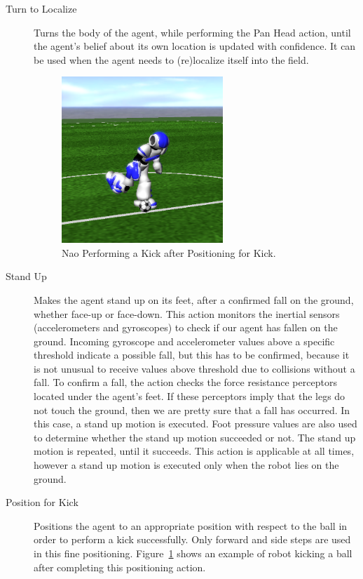 \begin{description}
 \item[Turn to Localize] Turns the body of the agent, while performing the Pan Head action, until the agent's belief about its own location is updated with confidence. It can be used when the agent needs to (re)localize itself into the field.

\begin{figure}[t!]
  \centering
  \includegraphics[trim=0cm 3cm 0cm 4cm, clip,width=0.6\textwidth]{Chapter3/figures/NaoKick.png}
  \caption{Nao Performing a Kick after Positioning for Kick.}
  \label{fig:NaoKick}
\end{figure}

 \item[Stand Up] Makes the agent stand up on its feet, after a confirmed fall on the ground, whether face-up or face-down. This action monitors the inertial sensors (accelerometers and gyroscopes) to check if our agent has fallen on the ground. Incoming gyroscope and accelerometer values above a specific threshold indicate a possible fall, but this has to be confirmed, because it is not unusual to receive values above threshold due to collisions without a fall. To confirm a fall, the action checks the force resistance perceptors located under the agent's feet. If these perceptors imply that the legs do not touch the ground, then we are pretty sure that a fall has occurred. In this case, a stand up motion is executed. Foot pressure values are also used to determine whether the stand up motion succeeded or not. The stand up motion is repeated, until it succeeds. This action is applicable at all times, however a stand up motion is executed only when the robot lies on the ground. 

  
 \item[Position for Kick] Positions the agent to an appropriate position with respect to the ball in order to perform a kick successfully. Only forward and side steps are used in this fine positioning. Figure~\ref{fig:NaoKick} shows an example of robot kicking a ball after completing this positioning action.
  
  




\end{description}


